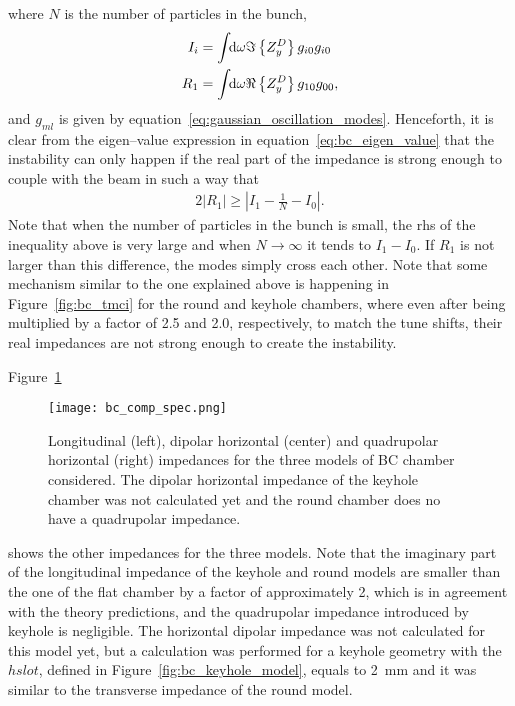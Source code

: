      where $N$ is the number of particles in the bunch,
     \begin{subequations}
         \begin{align}
             I_i &= \int\!\!\text{d}\omega \Im\left\{Z^D_y\right\}g_{i0}g_{i0} \\
             R_1 &= \int\!\!\text{d}\omega \Re\left\{Z^D_y\right\}g_{10}g_{00},
         \end{align}
     \end{subequations}
     and $g_{ml}$ is given by equation~\eqref{eq:gaussian_oscillation_modes}. Henceforth, it is clear from the eigen--value expression in equation~\eqref{eq:bc_eigen_value} that the instability can only happen if the real part of the impedance is strong enough to couple with the beam in such a way that
     \begin{align}
         2|R_1| \ge \left| I_1 - \frac1N - I_0 \right|.
     \end{align}
     Note that when the number of particles in the bunch is small, the \gls{rhs} of the inequality above is very large and when $N\to\infty$ it tends to $I_1-I_0$. If $R_1$ is not larger than this difference, the modes simply cross each other. Note that some mechanism similar to the one explained above is happening in Figure~\ref{fig:bc_tmci} for the round and keyhole chambers, where even after being multiplied by a factor of 2.5 and 2.0, respectively, to match the tune shifts, their real impedances are not strong enough to create the instability.

     Figure~\ref{fig:bc_comp_spec}
     \begin{figure}
         \centering
         \texttt{[image: bc\_comp\_spec.png]}
         \caption[Comparison of impedances of different models of BC chamber.]{Longitudinal (left), dipolar horizontal (center) and quadrupolar horizontal (right) impedances for the three models of BC chamber considered. The dipolar horizontal impedance of the keyhole chamber was not calculated yet and the round chamber does no have a quadrupolar impedance.}
         \label{fig:bc_comp_spec}
     \end{figure}
     shows the other impedances for the three models. Note that the imaginary part of the longitudinal impedance of the keyhole and round models are smaller than the one of the flat chamber by a factor of approximately 2, which is in agreement with the theory predictions, and the quadrupolar impedance introduced by keyhole is negligible. The horizontal dipolar impedance was not calculated for this model yet, but a calculation was performed for a keyhole geometry with the $hslot$, defined in Figure~\ref{fig:bc_keyhole_model}, equals to \SI{2}{\milli\meter} and it was similar to the transverse impedance of the round model.

